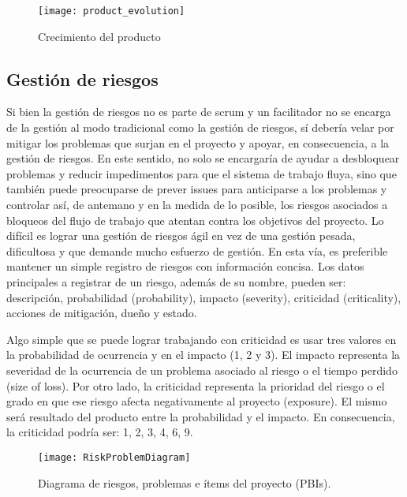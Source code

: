 \begin{figure}[h]
  \centering
  \texttt{[image: product\_evolution]}
  \caption{Crecimiento del producto}
  \centering
  \label{fig:product_evolution} %
\end{figure}

\subsection{Gestión de riesgos}

Si bien la gestión de riesgos no es parte de scrum y un facilitador no se encarga de la gestión al modo tradicional como la gestión de riesgos, sí debería velar por mitigar los problemas que surjan en el proyecto y apoyar, en consecuencia, a la gestión de riesgos. En este sentido, no solo se encargaría de ayudar a desbloquear problemas y reducir impedimentos para que el sistema de trabajo fluya, sino que también puede preocuparse de prever issues para anticiparse a los problemas y controlar así, de antemano y en la medida de lo posible, los riesgos asociados a bloqueos del flujo de trabajo que atentan contra los objetivos del proyecto. Lo difícil es lograr una gestión de riesgos ágil en vez de una gestión pesada, dificultosa y que demande mucho esfuerzo de gestión. En esta vía, es preferible mantener un simple registro de riesgos con información concisa. Los datos principales a registrar de un riesgo, además de su nombre, pueden ser: descripción, probabilidad (probability), impacto (severity), criticidad (criticality), acciones de mitigación, dueño y estado.

Algo simple que se puede lograr trabajando con criticidad es usar tres valores en la probabilidad de ocurrencia y en el impacto (1, 2 y 3). El impacto representa la severidad de la ocurrencia de un problema asociado al riesgo o el tiempo perdido (size of loss). Por otro lado, la criticidad representa la prioridad del riesgo o el grado en que ese riesgo afecta negativamente al proyecto (exposure). El mismo será resultado del producto entre la probabilidad y el impacto. En consecuencia, la criticidad podría ser: 1, 2, 3, 4, 6, 9.

\begin{figure}[h]
  \centering
  \texttt{[image: RiskProblemDiagram]}
  \caption{Diagrama de riesgos, problemas e ítems del proyecto (PBIs).}
  \centering
  \label{fig:RiskProblemDiagram} %
\end{figure}

